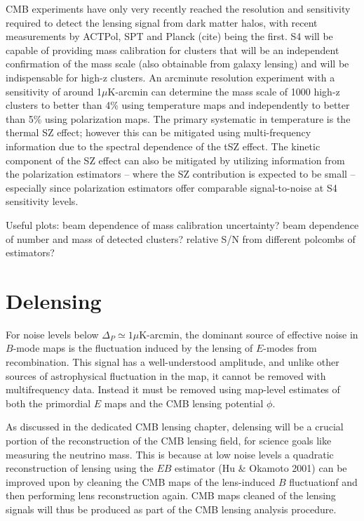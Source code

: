 CMB experiments have only very recently reached the resolution and sensitivity required to detect the lensing signal from dark matter halos, with recent measurements by ACTPol, SPT and Planck (cite) being the first. S4 will be capable of providing mass calibration for clusters that will be an independent confirmation of the mass scale (also obtainable from galaxy lensing) and will be indispensable for high-z clusters. An arcminute resolution experiment with a sensitivity of around 1$\mu$K-arcmin can determine the mass scale of 1000 high-z clusters to better than 4\% using temperature maps and independently to better than 5\% using polarization maps. The primary systematic in temperature is the thermal SZ effect; however this can be mitigated using multi-frequency information due to the spectral dependence of the tSZ effect. The kinetic component of the SZ effect can also be mitigated by utilizing information from the polarization estimators -- where the SZ contribution is expected to be small -- especially since polarization estimators offer comparable signal-to-noise at S4 sensitivity levels.

Useful plots: beam dependence of mass calibration uncertainty? beam dependence of number and mass of detected clusters? relative S/N from different polcombs of estimators?



\section{Delensing}\label{delens}

For noise levels below $\Delta_P \simeq 1 \mu$K-arcmin,  the dominant source of effective noise in $B$-mode maps is the fluctuation induced by the lensing of $E$-modes from recombination.  This signal has a well-understood amplitude, and unlike other sources of astrophysical fluctuation in the map, it cannot be removed with multifrequency data.  Instead it must be removed using map-level estimates of both the primordial $E$ maps and the CMB lensing potential $\phi$.

As discussed in the dedicated CMB lensing chapter, delensing will be a crucial portion of the reconstruction of the CMB lensing field, for science goals like measuring the neutrino mass.  This is because at low noise levels a quadratic reconstruction of lensing using the $EB$ estimator (Hu \& Okamoto 2001) can be improved upon by cleaning the CMB maps of the lens-induced $B$ fluctuationf and then performing lens reconstruction again.  CMB maps cleaned of the lensing signals will thus be produced as part of the CMB lensing analysis procedure.

